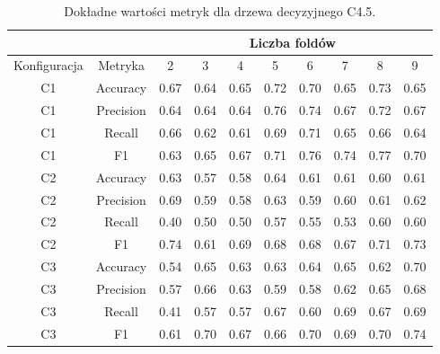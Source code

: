\begin{table}[H]
  \center
\begin{tabular}{|c|c|c|c|c|c|c|c|c|c|}  \hline
  \multicolumn{2}{|c|}{} & \multicolumn{8}{c|}{Liczba foldów} \\ \hline
Konfiguracja &    Metryka &     2 &     3 &     4 &     5 &     6 &     7 &     8 &     9 \\ \hline
          C1 &   Accuracy &  0.67 &  0.64 &  0.65 &  0.72 &  0.70 &  0.65 &  0.73 &  0.65 \\ \hline
          C1 &  Precision &  0.64 &  0.64 &  0.64 &  0.76 &  0.74 &  0.67 &  0.72 &  0.67 \\ \hline
          C1 &     Recall &  0.66 &  0.62 &  0.61 &  0.69 &  0.71 &  0.65 &  0.66 &  0.64 \\ \hline
          C1 &         F1 &  0.63 &  0.65 &  0.67 &  0.71 &  0.76 &  0.74 &  0.77 &  0.70 \\ \hline \hline
          C2 &   Accuracy &  0.63 &  0.57 &  0.58 &  0.64 &  0.61 &  0.61 &  0.60 &  0.61 \\ \hline
          C2 &  Precision &  0.69 &  0.59 &  0.58 &  0.63 &  0.59 &  0.60 &  0.61 &  0.62 \\ \hline
          C2 &     Recall &  0.40 &  0.50 &  0.50 &  0.57 &  0.55 &  0.53 &  0.60 &  0.60 \\ \hline
          C2 &         F1 &  0.74 &  0.61 &  0.69 &  0.68 &  0.68 &  0.67 &  0.71 &  0.73 \\ \hline \hline
          C3 &   Accuracy &  0.54 &  0.65 &  0.63 &  0.63 &  0.64 &  0.65 &  0.62 &  0.70 \\ \hline
          C3 &  Precision &  0.57 &  0.66 &  0.63 &  0.59 &  0.58 &  0.62 &  0.65 &  0.68 \\ \hline
          C3 &     Recall &  0.41 &  0.57 &  0.57 &  0.67 &  0.60 &  0.69 &  0.67 &  0.69 \\ \hline
          C3 &         F1 &  0.61 &  0.70 &  0.67 &  0.66 &  0.70 &  0.69 &  0.70 &  0.74 \\ \hline
\end{tabular}
  \caption{Dokładne wartości metryk dla drzewa decyzyjnego C4.5.}
\end{table}
